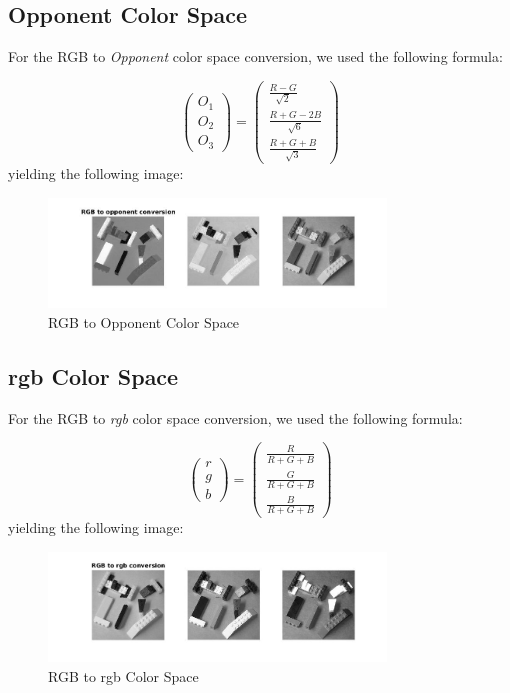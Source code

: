\documentclass[11pt]{article}
\begin{document}
\subsection{Opponent Color Space}
For the RGB to \textit{Opponent} color space conversion, we used the following formula:

$$
\begin{pmatrix}
	O_1 \\
	O_2 	\\
	O_3
\end{pmatrix} = 
\begin{pmatrix}
	\frac{R - G}{\sqrt{2}}			\\
	\frac{R + G - 2B}{\sqrt{6}}		\\
	\frac{R + G + B}{\sqrt{3}}
\end{pmatrix}
$$
yielding the following image:

\begin{figure}[H]
    \centering
    \includegraphics[width=0.8\textwidth]{bricks_to_opponent.jpg}
    \caption{RGB to Opponent Color Space}
    \label{fig:opponent_color}
\end{figure}


\subsection{rgb Color Space}
For the RGB to \textit{rgb} color space conversion, we used the following formula:

$$
\begin{pmatrix}
	r \\
	g 	\\
	b
\end{pmatrix} = 
\begin{pmatrix}
	\frac{R}{R + G + B}			\\
	\frac{G}{R + G + B}		\\
	\frac{B}{R + G + B}
\end{pmatrix}
$$
yielding the following image:

\begin{figure}[H]
    \centering
    \includegraphics[width=0.8\textwidth]{bricks_to_rgb.jpg}
    \caption{RGB to rgb Color Space}
    \label{fig:rgb_color}
\end{figure}
\end{document}
